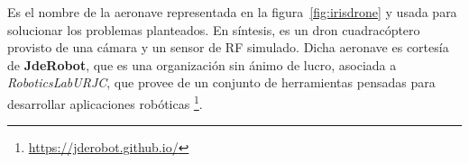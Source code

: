 Es el nombre de la aeronave representada en la figura~\ref{fig:irisdrone} y usada para solucionar los problemas planteados. En síntesis, es un dron cuadracóptero provisto de una cámara y un sensor de \ac{RF} simulado. Dicha aeronave es cortesía de \textbf{JdeRobot}, que es una organización sin ánimo de lucro, asociada a \emph{RoboticsLabURJC}, que provee de un conjunto de herramientas pensadas para desarrollar aplicaciones robóticas \footnote[16]{\url{https://jderobot.github.io/}}.\\